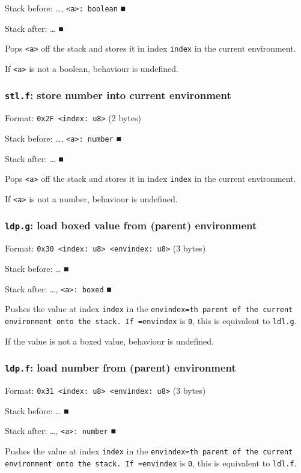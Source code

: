 \documentclass[11pt]{article}
\begin{document}
Stack before: \ldots{}​, \texttt{<a>: boolean} ■

Stack after: \ldots{}​ ■

Pops \texttt{<a>} off the stack and stores it in index \texttt{index} in the current
environment.

If \texttt{<a>} is not a boolean, behaviour is undefined.

\subsubsection{\texttt{stl.f}: store number into current environment}
\label{sec:org29b23b4}
Format: \texttt{0x2F <index: u8>} (2 bytes)

Stack before: \ldots{}​, \texttt{<a>: number} ■

Stack after: \ldots{}​ ■

Pops \texttt{<a>} off the stack and stores it in index \texttt{index} in the current
environment.

If \texttt{<a>} is not a number, behaviour is undefined.

\subsubsection{\texttt{ldp.g}: load boxed value from (parent) environment}
\label{sec:org445285b}
Format: \texttt{0x30 <index: u8> <envindex: u8>} (3 bytes)

Stack before: \ldots{}​ ■

Stack after: \ldots{}​, \texttt{<a>: boxed} ■

Pushes the value at index \texttt{index} in the \texttt{envindex=th parent of the
current environment onto the stack. If =envindex} is \texttt{0}, this is
equivalent to \texttt{ldl.g}.

If the value is not a boxed value, behaviour is undefined.

\subsubsection{\texttt{ldp.f}: load number from (parent) environment}
\label{sec:orgf48099d}
Format: \texttt{0x31 <index: u8> <envindex: u8>} (3 bytes)

Stack before: \ldots{}​ ■

Stack after: \ldots{}​, \texttt{<a>: number} ■

Pushes the value at index \texttt{index} in the \texttt{envindex=th parent of the
current environment onto the stack. If =envindex} is \texttt{0}, this is
equivalent to \texttt{ldl.f}.
\end{document}
